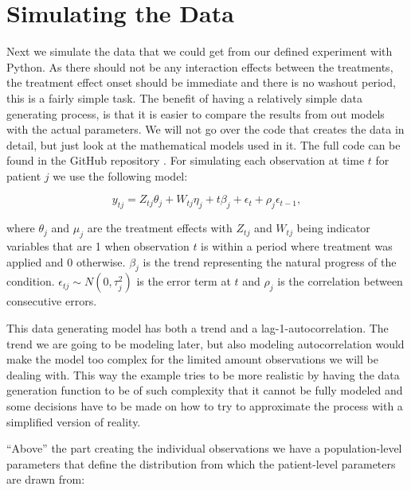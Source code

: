 \documentclass[12pt,a4paper,leqno]{report}
\theoremstyle{plain}
\theoremstyle{definition}
\theoremstyle{remark}
\begin{document}
\section{Simulating the Data}

Next we simulate the data that we could get from our defined experiment with Python.
As there should not be any interaction effects between the treatments, the treatment
effect onset should be immediate and there is no washout period, this is a fairly simple
task. The benefit of having a relatively simple data generating process, is that it is
easier to compare the results from out models with the actual parameters. We will not go
over the code that creates the data in detail, but just look at
the mathematical models used in it. The full code can be found in the GitHub repository
\cite{github}. For simulating each observation at time \(t\) for patient \(j\) we use the following model:

\begin{def}\label{simulationmodel}
    \begin{equation}\label{}
        y_{tj} = Z_{tj}\theta_{j} + W_{tj}\eta_{j} + t\beta_j + \epsilon_t + \rho_j\epsilon_{t-1},
    \end{equation}
\end{def}where \(\theta_j\) and \(\mu_j\) are the treatment effects with \(Z_{tj}\) and \(W_{tj}\) being indicator
variables that are 1 when observation \(t\) is within a period where treatment was applied and
0 otherwise. \(\beta_j\) is the trend representing the natural progress of the
condition. \(\epsilon_{tj} \sim N(0,\tau_j^2) \) is the error term at \(t\) and
\(\rho_j\) is the correlation between consecutive errors.

This data generating model has both a trend and a lag-1-autocorrelation. The trend we
are going to be modeling later, but also modeling autocorrelation would make the model
too complex for the limited amount observations we will be dealing with. This way the example tries to be more realistic
by having the data generation function to be of such complexity that it cannot be
fully modeled and some decisions have to be made on how to try to approximate
the process with a simplified version of reality.

``Above'' the part creating the individual observations we have a population-level parameters
that define the distribution from which the patient-level parameters are drawn from:

\bigskip
\end{document}
